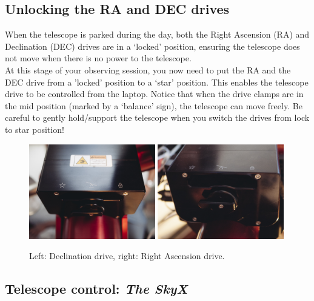 \documentclass[12pt,twoside,a4paper]{report}
\begin{document}
\subsection{Unlocking the RA and DEC drives}

When the telescope is parked during the day, both the Right Ascension (RA) and Declination (DEC) drives are 
in a `locked' position, ensuring the telescope does not move when there is no power to the telescope.\\

At this stage of your observing session, you now need to put the RA and the DEC drive from a 'locked' position
to a `star' position. This enables the telescope drive to be controlled from the laptop. 
Notice that when the drive clamps are in the mid position (marked by a `balance' sign), the telescope 
can move freely. Be careful to gently hold/support the telescope when you switch the drives from 
lock to star position!

\begin{figure}[ht]
 \centering
    \includegraphics[width=0.49\textwidth]{documentation_images/drive_Dec}
    \includegraphics[width=0.49\textwidth]{documentation_images/drive_RA}
    \caption{\label{fig:drives}Left: Declination drive, right: Right Ascension drive.}
\end{figure}

\subsection{Telescope control: \emph{The SkyX}}
\label{telescope_control}
\end{document}
